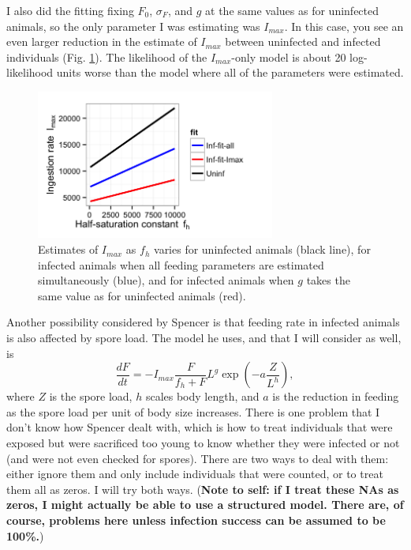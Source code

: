 \documentclass[12pt,reqno,final,pdftex]{amsart}\usepackage[]{graphicx}\usepackage[]{color}
\newenvironment{knitrout}{}{} %
\theoremstyle{plain}
\numberwithin{equation}{part}
\begin{document}
I also did the fitting fixing $F_0$, $\sigma_F$, and $g$ at the same values as for uninfected animals, so the only parameter I was estimating was $I_{max}$.
In this case, you see an even larger reduction in the estimate of $I_{max}$ between uninfected and infected individuals (Fig. \ref{fig:Imax-comp}).
The likelihood of the $I_{max}$-only model is about 20 log-likelihood units worse than the model where all of the parameters were estimated.
\begin{knitrout}\scriptsize
{}\color{fgcolor}\begin{figure}

\includegraphics[width=0.7\textwidth]{figure/Imax-comp-1} \hfill{}

\caption[Estimates of ]{Estimates of $I_{max}$ as $f_h$ varies for uninfected animals (black line), for infected animals when all feeding parameters are estimated simultaneously (blue), and for infected animals when $g$ takes the same value as for uninfected animals (red).}\label{fig:Imax-comp}
\end{figure}


\end{knitrout}

Another possibility considered by Spencer is that feeding rate in infected animals is also affected by spore load.
The model he uses, and that I will consider as well, is
\begin{equation*}
\frac{dF}{dt} = -I_{max} \frac{F}{f_h+F} L^g \exp\left(-a\frac{Z}{L^h}\right),
\end{equation*}
where $Z$ is the spore load, $h$ scales body length, and $a$ is the reduction in feeding as the spore load per unit of body size increases.
There is one problem that I don't know how Spencer dealt with, which is how to treat individuals that were exposed but were sacrificed too young to know whether they were infected or not (and were not even checked for spores).
There are two ways to deal with them: either ignore them and only include individuals that were counted, or to treat them all as zeros.
I will try both ways.
(\textbf{Note to self: if I treat these NAs as zeros, I might actually be able to use a structured model.
There are, of course, problems here unless infection success can be assumed to be 100\%.})
\end{document}
